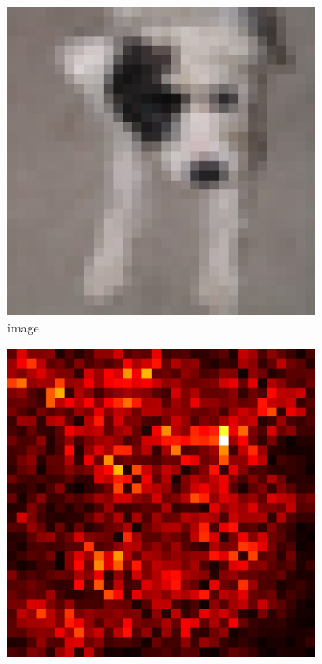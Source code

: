 \documentclass[preprint,12pt]{elsarticle}
\begin{document}
\begin{figure}
    \centering
    \begin{subfigure}{0.14\linewidth}
        \centering
        \includegraphics[width=\linewidth]{../visualizations/examples/cifar10/resnet18/images/5.png}
        \caption{image}
    \end{subfigure}
    \hfill
    \begin{subfigure}{0.14\linewidth}
        \centering
        \includegraphics[width=\linewidth]{../visualizations/examples/cifar10/resnet18/saliency_map/5.png}

\end{subfigure}
\end{figure}
\end{document}
